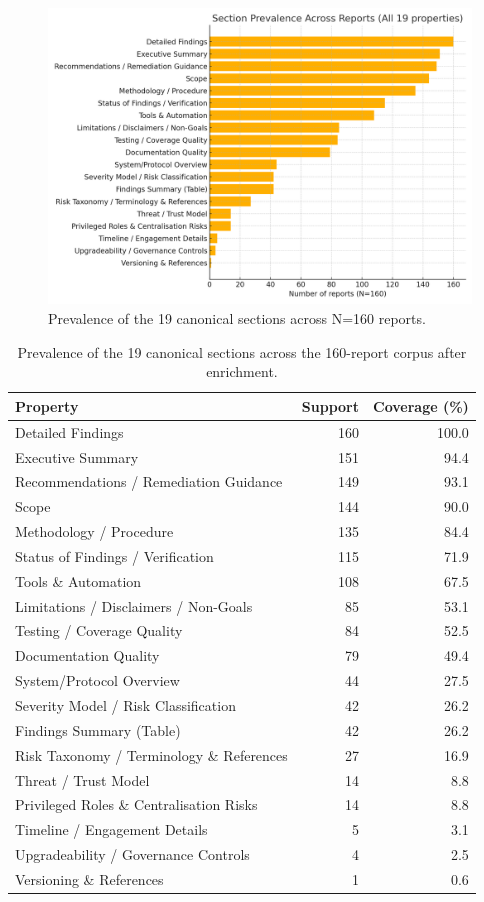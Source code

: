 \begin{figure}[t]
  \centering
  \includegraphics[width=0.95\linewidth]{figure_attribute_prevalence_160_all19.png}
  \caption{Prevalence of the 19 canonical sections across N=160 reports.}
  \label{fig:rq2-prevalence}
\end{figure}


    \begin{table}[t]
    \centering
    \small
    \begin{tabular}{lrr}
    \toprule
    Property & Support & Coverage (\%) \\
\midrule
Detailed Findings & 160 & 100.0 \\
Executive Summary & 151 & 94.4 \\
Recommendations / Remediation Guidance & 149 & 93.1 \\
Scope & 144 & 90.0 \\
Methodology / Procedure & 135 & 84.4 \\
Status of Findings / Verification & 115 & 71.9 \\
Tools \& Automation & 108 & 67.5 \\
Limitations / Disclaimers / Non-Goals & 85 & 53.1 \\
Testing / Coverage Quality & 84 & 52.5 \\
Documentation Quality & 79 & 49.4 \\
System/Protocol Overview & 44 & 27.5 \\
Severity Model / Risk Classification & 42 & 26.2 \\
Findings Summary (Table) & 42 & 26.2 \\
Risk Taxonomy / Terminology \& References & 27 & 16.9 \\
Threat / Trust Model & 14 & 8.8 \\
Privileged Roles \& Centralisation Risks & 14 & 8.8 \\
Timeline / Engagement Details & 5 & 3.1 \\
Upgradeability / Governance Controls & 4 & 2.5 \\
Versioning \& References & 1 & 0.6 \\
    \bottomrule
    \end{tabular}
    \caption{Prevalence of the 19 canonical sections across the 160-report corpus after enrichment.}
    \label{tab:rq2-prevalence}
    \end{table}


